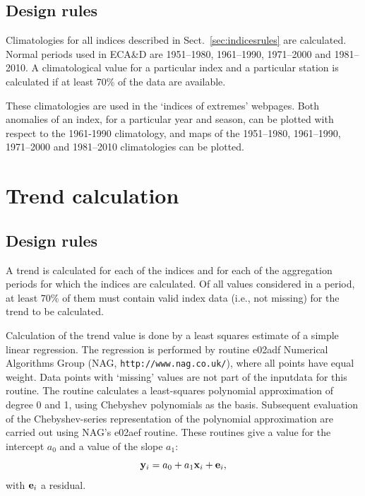 \documentclass[a4paper,11pt]{article}
\begin{document}
\subsection{Design rules}
\label{sec:climatologyrules}
Climatologies for all indices described in Sect.~\ref{sec:indicesrules}
are calculated. Normal periods used in ECA\&D are 1951--1980, 1961--1990, 1971--2000
and 1981--2010.
A climatological value for a particular index and a particular station is
calculated if at least 70\% of the data are available.

These climatologies are used in the `indices of extremes' webpages. Both anomalies
of an index, for a particular year and season, can be plotted with respect to the
1961-1990 climatology, and maps of the 1951--1980, 1961--1990, 1971--2000 and 1981--2010 climatologies can
be plotted.


\section{Trend calculation}
\label{sec:trend}
\subsection{Design rules}
\label{sec:trendrules}

A trend is calculated for each of the indices and for each of the
aggregation periods for which the indices are calculated. Of all values considered
in a period, at least 70\% of them must contain valid index data
(i.e., not missing) for the trend to be calculated.

Calculation of the trend value is done by a least squares estimate of a simple linear regression. The regression is
performed by routine e02adf Numerical Algorithms Group (NAG, {\tt http://www.nag.co.uk/}), 
where all points have equal weight. Data points with `missing' values are not
part of the inputdata for this routine. The routine calculates a least-squares polynomial approximation of degree 0
and 1, using Chebyshev polynomials as the basis.  Subsequent evaluation of the Chebyshev-series representation
of the polynomial approximation are carried out using NAG's e02aef routine.
These routines give a value for the intercept $a_0$ and a value of the slope $a_1$:
\begin{equation*}
{\bf y}_i = a_0 + a_1 {\bf x}_i + {\bf e}_i,
\end{equation*}
with ${\bf e}_i$ a residual.
\end{document}
